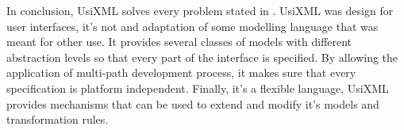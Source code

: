 In conclusion, UsiXML solves every problem stated in \cite{mecano}. UsiXML was design for user interfaces, it's not and adaptation of some modelling language that was meant for other use. It provides several classes of models with different abstraction levels so that every part of the interface is specified. By allowing the application of multi-path development process, it makes sure that every specification is platform independent. Finally, it's a flexible language, UsiXML provides mechanisms that can be used to extend and modify it's models and transformation rules.